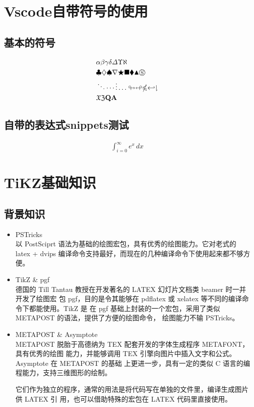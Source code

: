 \documentclass[fontset=windows]{article}
\begin{document}
\tableofcontents
\newpage
\section{Vscode自带符号的使用}
\subsection{基本的符号}
\begin{align*}
    &\alpha \beta \gamma \delta \varDelta \Upsilon \aleph \\
    &\clubsuit \diamondsuit \spadesuit \nabla \bigstar \blacksquare \blacklozenge \blacktriangle \circledS \\
    &\ddots \cdots \vdots \ldots \looparrowright \looparrowleft \nleqslant \hookleftarrow \downharpoonright \\
    &\mathfrak{X} \mathfrak{Z} \mathbf{Q} \mathbf{A} 
\end{align*}

\subsection{自带的表达式snippets测试}
\begin{align*}
    \int_{i=0}^{\infty} e^x \,dx 
\end{align*}


\section{TiKZ基础知识}

\subsection{背景知识}

\begin{itemize}
    \item PSTricks\\
    以 PostSciprt 语法为基础的绘图宏包，具有优秀的绘图能力。它对老式的 latex + dvips
    编译命令支持最好，而现在的几种编译命令下使用起来都不够方便。
    \item TikZ \& pgf\\
    德国的 Till Tantau 教授在开发著名的 LATEX 幻灯片文档类 beamer 时一并开发了绘图宏
    包 pgf，目的是令其能够在 pdflatex 或 xelatex 等不同的编译命令下都能使用。TikZ 是
    在 pgf 基础上封装的一个宏包，采用了类似 METAPOST 的语法，提供了方便的绘图命令，
    绘图能力不输 PSTricks。
    \item METAPOST \& Asymptote\\
    METAPOST 脱胎于高德纳为 TEX 配套开发的字体生成程序 METAFONT，具有优秀的绘图
    能力，并能够调用 TEX 引擎向图片中插入文字和公式。Asymptote 在 METAPOST 的基础
    上更进一步，具有一定的类似 C 语言的编程能力，支持三维图形的绘制。

    它们作为独立的程序，通常的用法是将代码写在单独的文件里，编译生成图片供 LATEX 引
    用，也可以借助特殊的宏包在 LATEX 代码里直接使用。
\end{itemize}
\end{document}
